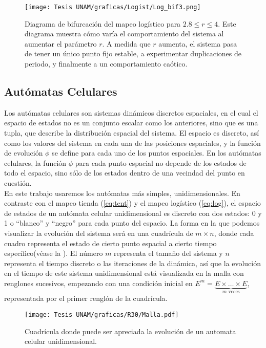 \documentclass[../Main.tex]{subfiles}
\begin{document}
\begin{figure}[h!]
    \centering
    \texttt{[image: Tesis UNAM/graficas/Logist/Log\_bif3.png]}
    \caption{Diagrama de bifurcación del mapeo logístico para \( 2.8 \leq r \leq 4 \). Este diagrama muestra cómo varía el comportamiento del sistema al aumentar el parámetro \( r \). A medida que \( r \) aumenta, el sistema pasa de tener un único punto fijo estable, a experimentar duplicaciones de periodo, y finalmente a un comportamiento caótico.}
    
    \label{fig:bif-log}
\end{figure} 
\subsection{Autómatas Celulares} 


Los autómatas celulares son sistemas dinámicos discretos espaciales, en el cual el espacio de estados no es un conjunto escalar como los anteriores, sino que es una tupla, que describe la distribución espacial del sistema. El espacio es discreto, así como los valores del sistema en cada una de las posiciones espaciales, y la función de evolución $\phi$ se define para cada uno de los puntos espaciales. En los autómatas celulares, la función $\phi$ para cada punto espacial no depende de los estados de todo el espacio, sino sólo de los estados dentro de una vecindad del punto en cuestión. \\

En este trabajo usaremos los autómatas más simples,  unidimensionales. En contraste con el mapeo tienda (\ref{eq:tent}) y el mapeo logístico (\ref{eq:log}), el espacio de estados de un autómata celular unidimensional es discreto con dos estados: 0 y 1 o ``blanco'' y ``negro'' para cada punto del espacio. La forma en la que podemos visualizar la evolución del sistema será en una cuadrícula de $m\times n$, donde cada cuadro representa el estado de cierto punto espacial a cierto tiempo específico(véase la ). El número $m$ representa el tamaño del sistema y $n$ representa el tiempo discreto o las iteraciones de la dinámica, así que la evolución en el tiempo de este sistema unidimensional está visualizada en la malla con renglones sucesivos, empezando con una condición inicial en $E^m=\underbrace{E\times \dots \times E}_{m \text{ veces}}$, representada por el primer renglón de la cuadrícula. 

\begin{figure}[h]
\centering
\texttt{[image: Tesis UNAM/graficas/R30/Malla.pdf]}
\caption{Cuadrícula donde puede ser apreciada la evolución de un automata celular unidimensional.}
\label{fig:malla}
\end{figure}
\end{document}
